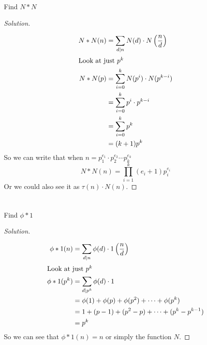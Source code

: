 \documentclass[11pt]{article}
\newenvironment{myproblem}[1][Problem]{\begin{trivlist}
    \item[\hskip \labelsep {\bfseries #1.}]}{\end{trivlist}}
\newenvironment{solution}
  {\renewcommand\qedsymbol{$~$}\begin{proof}[Solution]$ $\par\nobreak\ignorespaces}
  {\end{proof}}
\begin{document}
\section{}

\begin{myproblem}
  Find $N * N$
\end{myproblem}

\begin{solution}
  \begin{align*}
    N * N(n) & = \sum_{d|n} N(d) \cdot N\left(\frac{n}{d}\right) \\
    \intertext{Look at just $p^k$}
    N * N(p) & =  \sum_{i=0}^k N(p^{i}) \cdot N(p^{k-i})         \\
             & =  \sum_{i=0}^k p^{i} \cdot p^{k-i}               \\
             & =  \sum_{i=0}^k p^{k}                             \\
             & =  (k+1) p^{k}                                    \\
  \end{align*}
  So we can write that when $n=p_1^{e_1}\cdot p_2^{e_2}\cdots p_k^{e_k}$
  \[
    N * N(n) = \prod_{i=1}^{k} (e_i+1)p_i^{e_i}
  \]
  Or we could also see it as $\tau(n)\cdot N(n)$.
\end{solution}


\section{}

\begin{myproblem}
  Find $\phi * 1$
\end{myproblem}

\begin{solution}
  \begin{align*}
    \phi * 1(n)   & = \sum_{d|n} \phi(d) \cdot 1\left(\frac{n}{d}\right) \\
    \intertext{Look at just $p^k$}
    \phi * 1(p^k) & =  \sum_{d|p^k} \phi(d) \cdot 1                      \\
                  & =  \phi(1) + \phi(p) + \phi(p^2) +\cdots + \phi(p^k) \\
                  & =1 + (p-1) + (p^2-p) + \cdots + (p^k-p^{k-1})        \\
                  & =p^k                                                 \\
  \end{align*}
  So we can see that $\phi * 1(n)=n$ or simply the function $N$.
\end{solution}
\end{document}
